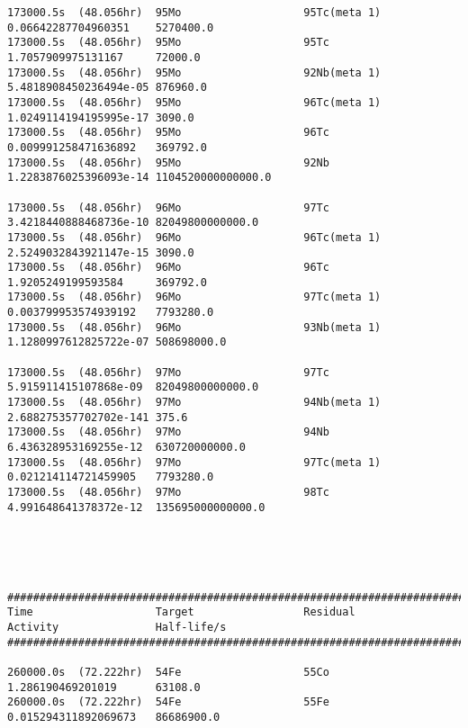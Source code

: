 \begin{lstlisting}[style=sOutputFile,caption={Final results for steel irradiation},label={listing:alexsteel}]
173000.5s  (48.056hr)  95Mo                   95Tc(meta 1)           0.06642287704960351    5270400.0             
173000.5s  (48.056hr)  95Mo                   95Tc                   1.7057909975131167     72000.0               
173000.5s  (48.056hr)  95Mo                   92Nb(meta 1)           5.4818908450236494e-05 876960.0              
173000.5s  (48.056hr)  95Mo                   96Tc(meta 1)           1.0249114194195995e-17 3090.0                
173000.5s  (48.056hr)  95Mo                   96Tc                   0.009991258471636892   369792.0              
173000.5s  (48.056hr)  95Mo                   92Nb                   1.2283876025396093e-14 1104520000000000.0    

173000.5s  (48.056hr)  96Mo                   97Tc                   3.4218440888468736e-10 82049800000000.0      
173000.5s  (48.056hr)  96Mo                   96Tc(meta 1)           2.5249032843921147e-15 3090.0                
173000.5s  (48.056hr)  96Mo                   96Tc                   1.9205249199593584     369792.0              
173000.5s  (48.056hr)  96Mo                   97Tc(meta 1)           0.003799953574939192   7793280.0             
173000.5s  (48.056hr)  96Mo                   93Nb(meta 1)           1.1280997612825722e-07 508698000.0           

173000.5s  (48.056hr)  97Mo                   97Tc                   5.915911415107868e-09  82049800000000.0      
173000.5s  (48.056hr)  97Mo                   94Nb(meta 1)           2.688275357702702e-141 375.6                 
173000.5s  (48.056hr)  97Mo                   94Nb                   6.436328953169255e-12  630720000000.0        
173000.5s  (48.056hr)  97Mo                   97Tc(meta 1)           0.021214114721459905   7793280.0             
173000.5s  (48.056hr)  97Mo                   98Tc                   4.991648641378372e-12  135695000000000.0     





####################################################################################################################
Time                   Target                 Residual               Activity               Half-life/s            
####################################################################################################################

260000.0s  (72.222hr)  54Fe                   55Co                   1.286190469201019      63108.0               
260000.0s  (72.222hr)  54Fe                   55Fe                   0.015294311892069673   86686900.0            


\end{lstlisting}
